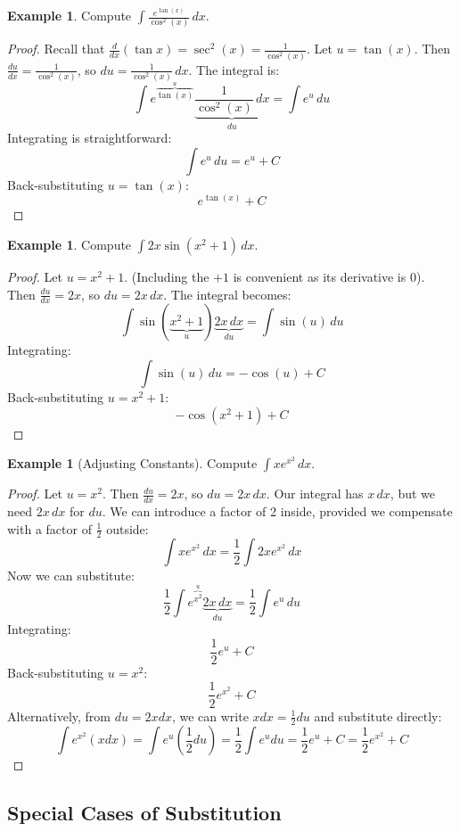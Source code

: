 \documentclass[11pt]{article}
\theoremstyle{definition}
\newtheorem{example}[theorem]{Example}
\theoremstyle{remark}
\begin{document}
\begin{example}
Compute $\int \frac{e^{\tan(x)}}{\cos^2(x)} \, dx$.
\begin{proof}
Recall that $\frac{d}{dx}(\tan x) = \sec^2(x) = \frac{1}{\cos^2(x)}$.
Let $u = \tan(x)$.
Then $\frac{du}{dx} = \frac{1}{\cos^2(x)}$, so $du = \frac{1}{\cos^2(x)} \, dx$.
The integral is:
\[ \int e^{\overbrace{\tan(x)}^{u}} \underbrace{\frac{1}{\cos^2(x)} \, dx}_{du} = \int e^u \, du \]
Integrating is straightforward:
\[ \int e^u \, du = e^u + C \]
Back-substituting $u = \tan(x)$:
\[ e^{\tan(x)} + C \]
\end{proof}
\end{example}

\begin{example}
Compute $\int 2x \sin(x^2+1) \, dx$.
\begin{proof}
Let $u = x^2+1$. (Including the $+1$ is convenient as its derivative is 0).
Then $\frac{du}{dx} = 2x$, so $du = 2x \, dx$.
The integral becomes:
\[ \int \sin(\underbrace{x^2+1}_{u}) \underbrace{2x \, dx}_{du} = \int \sin(u) \, du \]
Integrating:
\[ \int \sin(u) \, du = -\cos(u) + C \]
Back-substituting $u = x^2+1$:
\[ -\cos(x^2+1) + C \]
\end{proof}
\end{example}

\begin{example}[Adjusting Constants]
Compute $\int x e^{x^2} \, dx$.
\begin{proof}
Let $u = x^2$.
Then $\frac{du}{dx} = 2x$, so $du = 2x \, dx$.
Our integral has $x \, dx$, but we need $2x \, dx$ for $du$. We can introduce a factor of 2 inside, provided we compensate with a factor of $\frac{1}{2}$ outside:
\[ \int x e^{x^2} \, dx = \frac{1}{2} \int 2x e^{x^2} \, dx \]
Now we can substitute:
\[ \frac{1}{2} \int e^{\overbrace{x^2}^{u}} \underbrace{2x \, dx}_{du} = \frac{1}{2} \int e^u \, du \]
Integrating:
\[ \frac{1}{2} e^u + C \]
Back-substituting $u = x^2$:
\[ \frac{1}{2} e^{x^2} + C \]
Alternatively, from $du = 2x dx$, we can write $x dx = \frac{1}{2} du$ and substitute directly:
\[ \int e^{x^2} (x dx) = \int e^u (\frac{1}{2} du) = \frac{1}{2} \int e^u du = \frac{1}{2} e^u + C = \frac{1}{2} e^{x^2} + C \]
\end{proof}
\end{example}

\subsection{Special Cases of Substitution}
\end{document}
